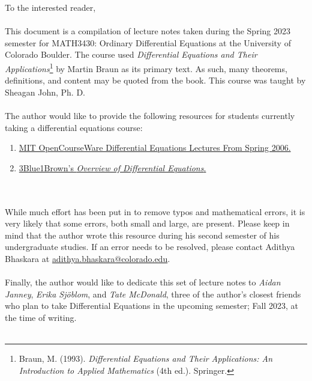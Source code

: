 To the interested reader,
\\
\\
This document is a compilation of lecture notes taken during the Spring 2023 semester for MATH3430: Ordinary Differential Equations at the University of Colorado Boulder. The course used \textit{Differential Equations and Their Applications}\footnote{Braun, M. (1993). \textit{Differential Equations and Their Applications: An Introduction to Applied Mathematics} (4th ed.). Springer. } by Martin Braun as its primary text. As such, many theorems, definitions, and content may be quoted from the book. This course was taught by Sheagan John, Ph. D.
\\
\\
The author would like to provide the following resources for students currently taking a differential equations course:
\begin{enumerate}
    \item \href{https://www.youtube.com/playlist?list=PLEC88901EBADDD980}{MIT OpenCourseWare Differential Equations Lectures From Spring 2006.}
    \item \href{https://www.youtube.com/playlist?list=PLZHQObOWTQDNPOjrT6KVlfJuKtYTftqH6}{3Blue1Brown's \textit{Overview of Differential Equations}.}
\end{enumerate}
\vphantom
\\
\\
While much effort has been put in to remove typos and mathematical errors, it is very likely that some errors, both small and large, are present. Please keep in mind that the author wrote this resource during his second semester of his undergraduate studies. If an error needs to be resolved, please contact Adithya Bhaskara at \href{mailto:adithya.bhaskara@colorado.edu}{adithya.bhaskara@colorado.edu}.
\\
\\
Finally, the author would like to dedicate this set of lecture notes to \textit{Aidan Janney}, \textit{Erika Sj\"{o}blom}, and \textit{Tate McDonald}, three of the author's closest friends who plan to take Differential Equations in the upcoming semester; Fall 2023, at the time of writing.
\\
\\
\vfill
{}